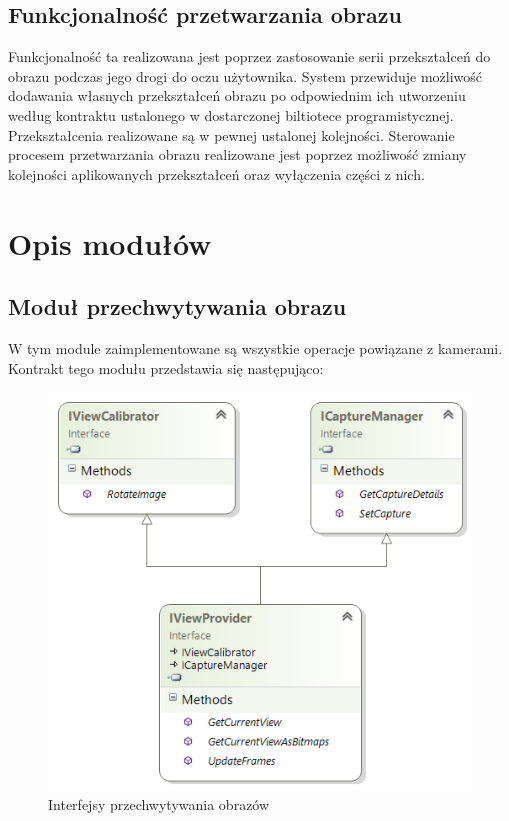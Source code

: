 \documentclass[a4paper,11pt,twoside]{report}
\theoremstyle{definition}
\begin{document}
\subsection{Funkcjonalność przetwarzania obrazu}

Funkcjonalność ta realizowana jest poprzez zastosowanie serii przekształceń do obrazu podczas jego drogi do oczu użytownika. System przewiduje możliwość dodawania własnych przekształceń obrazu po odpowiednim ich utworzeniu według kontraktu ustalonego w dostarczonej biltiotece programistycznej. Przekształcenia realizowane są w pewnej ustalonej kolejności. Sterowanie procesem przetwarzania obrazu realizowane jest poprzez możliwość zmiany kolejności aplikowanych przekształceń oraz wyłączenia części z nich.

\section{Opis modułów}


\subsection{Moduł przechwytywania obrazu}

W tym module zaimplementowane są wszystkie operacje powiązane z kamerami. Kontrakt tego modułu przedstawia się następująco:

\begin{figure}[h]
\centering
\includegraphics[scale=0.9]{images/IViewProvider}
\caption[Przechwytywanie diagram]{Interfejsy przechwytywania obrazów}
\end{figure}
\end{document}
